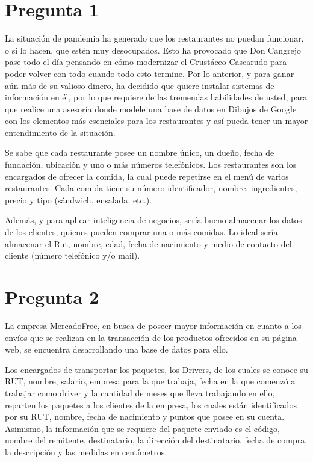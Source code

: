 \documentclass[letterpaper]{article}
\begin{document}
\section{Pregunta 1}

La situación de pandemia ha generado que los restaurantes no puedan funcionar, o si lo hacen, que estén muy desocupados. Esto ha provocado que Don Cangrejo pase todo el día pensando en cómo modernizar el Crustáceo Cascarudo para poder volver con todo cuando todo esto termine. Por lo anterior, y para ganar aún más de su valioso dinero, ha decidido que quiere instalar sistemas de información en él, por lo que requiere de las tremendas habilidades de usted, para que realice una asesoría donde modele una base de datos en Dibujos de Google con los elementos más esenciales para los restaurantes y así pueda tener un mayor entendimiento de la situación. 

Se sabe que cada restaurante posee un nombre único, un dueño, fecha de fundación, ubicación y uno o más números telefónicos. Los restaurantes son los encargados de ofrecer la comida, la cual puede repetirse en el menú de varios restaurantes. Cada comida tiene su número identificador, nombre, ingredientes, precio y tipo (sándwich, ensalada, etc.). 

Además, y para aplicar inteligencia de negocios, sería bueno almacenar los datos de los clientes, quienes pueden comprar una o más comidas. Lo ideal sería almacenar el Rut, nombre, edad, fecha de nacimiento y medio de contacto del cliente (número telefónico y/o mail).

\section{Pregunta 2}

La empresa MercadoFree, en busca de poseer mayor información en cuanto a los envíos que se realizan en la transacción de los productos ofrecidos en su página web, se encuentra desarrollando una base de datos para ello.

Los encargados de transportar los paquetes, los Drivers, de los cuales se conoce su RUT, nombre, salario, empresa para la que trabaja, fecha en la que comenzó a trabajar como driver y la cantidad de meses que lleva trabajando en ello, reparten los paquetes a los clientes de la empresa, los cuales están identificados por su RUT, nombre, fecha de nacimiento y puntos que posee en su cuenta. Asimismo, la información que se requiere del paquete enviado es el código, nombre del remitente, destinatario, la dirección del destinatario, fecha de compra, la descripción y las medidas en centímetros.
\end{document}
